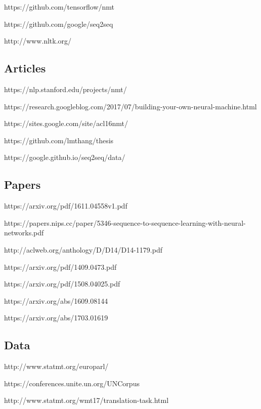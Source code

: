 \documentclass[10pt,a4paper]{report}
\begin{document}
https://github.com/tensorflow/nmt

https://github.com/google/seq2seq

http://www.nltk.org/

\subsection{Articles}

https://nlp.stanford.edu/projects/nmt/

https://research.googleblog.com/2017/07/building-your-own-neural-machine.html

https://sites.google.com/site/acl16nmt/

https://github.com/lmthang/thesis

https://google.github.io/seq2seq/data/

\subsection{Papers}

https://arxiv.org/pdf/1611.04558v1.pdf

https://papers.nips.cc/paper/5346-sequence-to-sequence-learning-with-neural-networks.pdf

http://aclweb.org/anthology/D/D14/D14-1179.pdf

https://arxiv.org/pdf/1409.0473.pdf

https://arxiv.org/pdf/1508.04025.pdf

https://arxiv.org/abs/1609.08144

https://arxiv.org/abs/1703.01619

\subsection{Data}

http://www.statmt.org/europarl/

https://conferences.unite.un.org/UNCorpus

http://www.statmt.org/wmt17/translation-task.html
\end{document}
